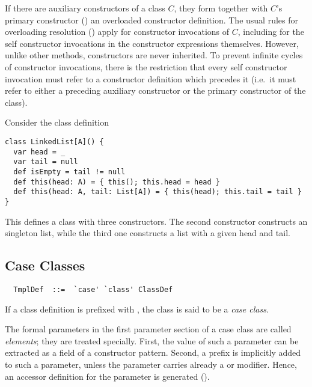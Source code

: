 If there are auxiliary constructors of a class $C$, they form together
with $C$'s primary constructor ()
an overloaded constructor
definition. The usual rules for overloading resolution
() apply for constructor invocations of $C$,
including for the self constructor invocations in the constructor
expressions themselves. However, unlike other methods, constructors
are never inherited.  To prevent infinite cycles of constructor
invocations, there is the restriction that every self constructor
invocation must refer to a constructor definition which precedes it
(i.e.\ it must refer to either a preceding auxiliary constructor or the
primary constructor of the class).  

\example Consider the class definition

\begin{lstlisting}
class LinkedList[A]() {
  var head = _ 
  var tail = null 
  def isEmpty = tail != null   
  def this(head: A) = { this(); this.head = head }
  def this(head: A, tail: List[A]) = { this(head); this.tail = tail }
}
\end{lstlisting}
This defines a class  with three constructors.  The
second constructor constructs an singleton list, while the
third one constructs a list with a given head and tail.

\subsection{Case Classes}
\label{sec:case-classes}

\syntax\begin{lstlisting} 
  TmplDef  ::=  `case' `class' ClassDef
\end{lstlisting}

If a class definition is prefixed with , the class is said
to be a {\em case class}.  

The formal parameters in the first parameter section of a case class
are called {\em elements}; they are treated
specially. First, the value of such a parameter can be extracted as a
field of a constructor pattern. Second, a  prefix is
implicitly added to such a parameter, unless the parameter carries
already a  or  modifier. Hence, an accessor
definition for the parameter is generated ().

